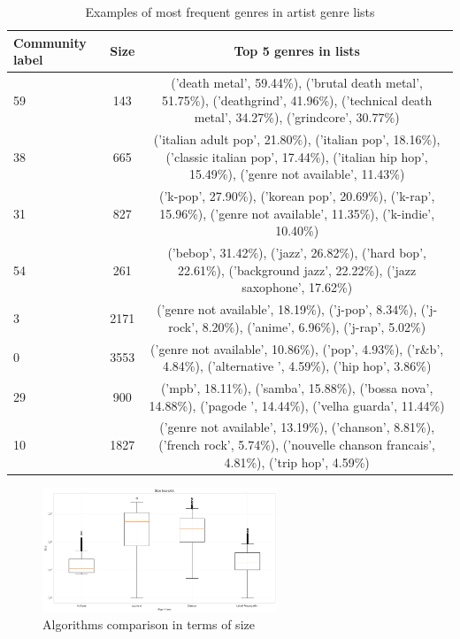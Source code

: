 \documentclass[sigchi]{acmart}
\begin{document}
\renewcommand{\arraystretch}{1.3}
\begin{table}[]
\begin{center}
\scriptsize
\begin{tabular}{ |l|c|c|} 
 \hline
 \textbf{Community label} & \textbf{Size} & \textbf{Top 5 genres in lists} \\
 \hline
59 & 143  & ('death metal', 59.44\%), ('brutal death metal', 51.75\%),
 ('deathgrind', 41.96\%),
 ('technical death metal', 34.27\%),
 ('grindcore', 30.77\%)\\
 38 & 665  & ('italian adult pop', 21.80\%),
   ('italian pop', 18.16\%),
   ('classic italian pop', 17.44\%),
   ('italian hip hop', 15.49\%),
   ('genre not available', 11.43\%)\\
 31 & 827  & ('k-pop', 27.90\%),
   ('korean pop', 20.69\%),
   ('k-rap', 15.96\%),
   ('genre not available', 11.35\%),
   ('k-indie', 10.40\%)\\
54 & 261  & ('bebop', 31.42\%),
   ('jazz', 26.82\%),
   ('hard bop', 22.61\%),
   ('background jazz', 22.22\%),
   ('jazz saxophone', 17.62\%)\\
   
3 & 2171  & ('genre not available', 18.19\%),
   ('j-pop', 8.34\%),
   ('j-rock', 8.20\%),
   ('anime', 6.96\%),
   ('j-rap', 5.02\%)\\

0 & 3553  & ('genre not available', 10.86\%),
   ('pop', 4.93\%),
   ('r\&b', 4.84\%),
   ('alternative ', 4.59\%),
   ('hip hop', 3.86\%)\\

29 & 900  & ('mpb', 18.11\%),
   ('samba', 15.88\%),
   ('bossa nova', 14.88\%),
   ('pagode ', 14.44\%),
   ('velha guarda', 11.44\%)\\

10 & 1827  & ('genre not available', 13.19\%),
   ('chanson', 8.81\%),
   ('french rock', 5.74\%),
   ('nouvelle chanson francais', 4.81\%),
   ('trip hop', 4.59\%)\\

   
 \hline
\end{tabular}
\end{center}
\caption{\label{table:genres}Examples of most frequent genres in artist genre lists}
\end{table}

\begin{figure}[H]
\centering
\includegraphics[width=7cm]{img/boxplot_size_comm.png}
\caption{Algorithms comparison in terms of size}
\label{fig: boxplot_community}
\end{figure}
\end{document}
